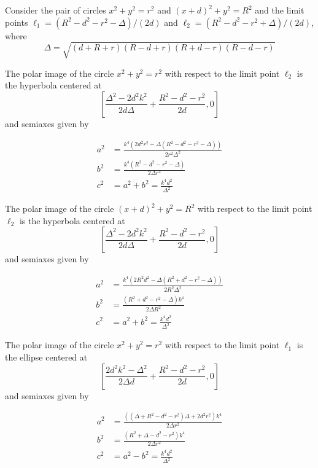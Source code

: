  Consider the pair of circles $x^2+y^2=r^2$
 and $(x+d)^2+y^2=R^2$ and the limit points
 $\ell_1= (R^2 - d^2 - r^2 -\Delta)/(2d)$ and $\ell_2=(R^2 - d^2 - r^2 + \Delta)/(2 d)$,
where
 \[ \Delta=\sqrt { \left( d+R+r \right)  \left( R-d+r \right)  \left( R+d-r
 \right)  \left( R-d-r \right) }\]

 \begin{lemma} The polar image of the circle $x^2+y^2=r^2$ with respect to the limit point $  \ell_2 $ is the hyperbola  centered at
 \[ \left[\frac{\Delta^2-2d^2k^2  }{2 d \Delta} + \frac{R^2 - d^2 - r^2}{ 2 d },0\right] \]
 and semiaxes given by
 
 \begin{align*}
     a^2&=\frac{k^4(   2d^2r^2-\Delta(R^2 - d^2 - r^2 - \Delta))}{2 r^2 \Delta^2}\\
     b^2&= \frac{k^4(R^2 - d^2 - r^2 - \Delta)}{2 \Delta r^2  } \\
     c^2&=a^2+b^2=\frac{k^4d^2}{\Delta^2}
 \end{align*}
 \end{lemma}
 
 
 \begin{lemma} The polar image of the circle $(x+d)^2+y^2=R^2$ with respect to the limit point $  \ell_2 $ is the hyperbola  centered at
 \[ \left[\frac{\Delta^2-2d^2k^2  }{2 d \Delta} + \frac{R^2 - d^2 - r^2}{ 2 d },0\right] \]
 and semiaxes given by
 
 \begin{align*}
     a^2&= \frac{k^4(2R^2d^2 - \Delta (R^2 + d^2 - r^2 - \Delta))}{ 2R^2 \Delta^2} \\
     b^2&=  \frac{(R^2+  d^2 - r^2 - \Delta)k^4}{ 2 \Delta R^2} \\
     c^2&=a^2+b^2=\frac{k^4d^2}{\Delta^2}
 \end{align*}
 \end{lemma}


\begin{lemma} The polar image of the circle $x^2+y^2=r^2$ with respect to the limit point $  \ell_1 $ is the ellipse  centered at
 \[ \left[ \frac{ 2 d^2 k^2 - \Delta^2}{ 2 \Delta d} + \frac{R^2 - d^2 - r^2}{ 2 d},0\right] \]
 and semiaxes given by
 
 \begin{align*}
     a^2&=\frac{( (\Delta + R^2 - d^2 - r^2)\Delta + 2d^2r^2)k^4}{ 2 \Delta r^2} \\
     b^2&=\frac{    (R^2+ \Delta-d^2 - r^2 ) k^4}{2 \Delta r^2} \\
     c^2&=a^2-b^2=\frac{k^4d^2}{\Delta^2}
 \end{align*}
 \end{lemma}
 
